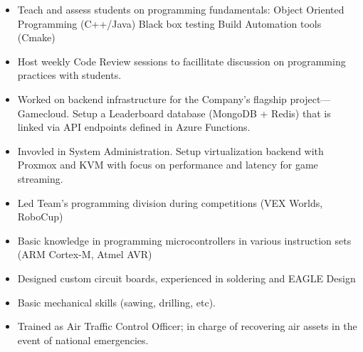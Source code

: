 \documentclass[10pt,a4paper,ragged2e,withhyper]{altacv}
\begin{document}
\begin{paracol}{2}

\begin{itemize}
  \item Teach and assess students on programming fundamentals:
  \subitem \bullet Object Oriented Programming (C++/Java)
  \subitem \bullet Black box testing
  \subitem \bullet Build Automation tools (Cmake)
  \item Host weekly Code Review sessions to facillitate discussion on programming practices with students.
\end{itemize}

\divider

\begin{itemize}
\item Worked on backend infrastructure for the Company’s flagship project—Gamecloud. Setup a Leaderboard database (MongoDB + Redis) that is linked via API endpoints defined in Azure Functions.

\item Invovled in System Administration. Setup virtualization backend with Proxmox and KVM with focus on performance and latency for game streaming.

\end{itemize}

\divider


\begin{itemize}
  \item Led Team's programming division during competitions (VEX Worlds, RoboCup)
  \item Basic knowledge in programming microcontrollers in various instruction sets (ARM Cortex-M, Atmel AVR)
  \item Designed custom circuit boards, experienced in soldering and EAGLE Design
  \item Basic mechanical skills (sawing, drilling, etc).
\end{itemize}

\divider

\begin{itemize}
\item Trained as Air Traffic Control Officer; in charge of recovering air assets in the event of national emergencies.


\end{itemize}
\end{paracol}
\end{document}
